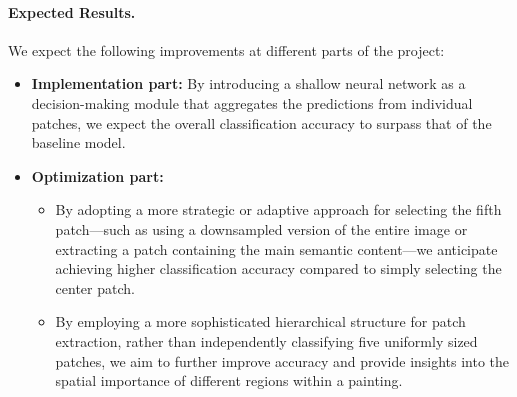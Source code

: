 \paragraph{Expected Results.}
We expect the following improvements at different parts of the project: \begin{itemize} \item \textbf{Implementation part:} By introducing a shallow neural network as a decision-making module that aggregates the predictions from individual patches, we expect the overall classification accuracy to surpass that of the baseline model. \item \textbf{Optimization part:} \begin{itemize} \item By adopting a more strategic or adaptive approach for selecting the fifth patch—such as using a downsampled version of the entire image or extracting a patch containing the main semantic content—we anticipate achieving higher classification accuracy compared to simply selecting the center patch. \item By employing a more sophisticated hierarchical structure for patch extraction, rather than independently classifying five uniformly sized patches, we aim to further improve accuracy and provide insights into the spatial importance of different regions within a painting. \end{itemize} \end{itemize}